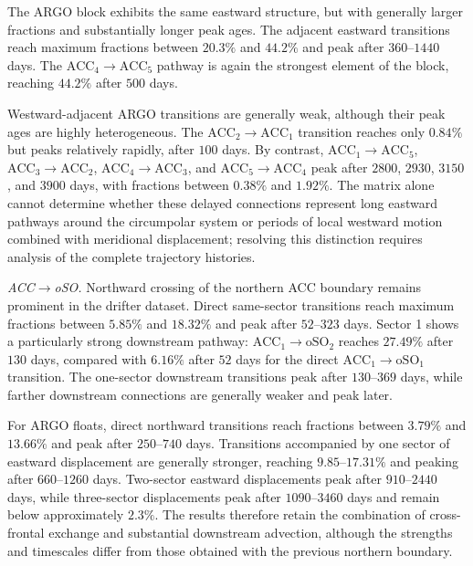 \documentclass[
  draft
]{agujournal2025}
\begin{document}
                The ARGO block exhibits the same eastward structure, but with generally larger fractions and substantially longer peak ages. The adjacent eastward transitions reach maximum fractions between $20.3 \%$ and $44.2 \%$ and peak after $360$--$1440$ days. The $\mathrm{ACC}_4 \rightarrow \mathrm{ACC}_5$ pathway is again the strongest element of the block, reaching $44.2 \%$ after $500$ days.
    
                Westward-adjacent ARGO transitions are generally weak, although their peak ages are highly heterogeneous. The $\mathrm{ACC}_2 \rightarrow \mathrm{ACC}_1$ transition reaches only $0.84 \%$ but peaks relatively rapidly, after $100$ days. By contrast, $\mathrm{ACC}_1 \rightarrow \mathrm{ACC}_5$, $\mathrm{ACC}_3 \rightarrow \mathrm{ACC}_2$, $\mathrm{ACC}_4 \rightarrow \mathrm{ACC}_3$, and $\mathrm{ACC}_5 \rightarrow \mathrm{ACC}_4$ peak after $2800$, $2930$, $3150$, and $3900$ days, with fractions between $0.38 \%$ and $1.92 \%$. The matrix alone cannot determine whether these delayed connections represent long eastward pathways around the circumpolar system or periods of local westward motion combined with meridional displacement; resolving this distinction requires analysis of the complete trajectory histories.
    
                \medskip
                \noindent
                \textit{ACC$\boldsymbol{\rightarrow}$oSO.}
                Northward crossing of the northern ACC boundary remains prominent in the drifter dataset. Direct same-sector transitions reach maximum fractions between $5.85 \%$ and $18.32 \%$ and peak after $52$--$323$ days. Sector 1 shows a particularly strong downstream pathway: $\mathrm{ACC}_1 \rightarrow \mathrm{oSO}_2$ reaches $27.49 \%$ after $130$ days, compared with $6.16 \%$ after $52$ days for the direct $\mathrm{ACC}_1 \rightarrow \mathrm{oSO}_1$ transition. The one-sector downstream transitions peak after $130$--$369$ days, while farther downstream connections are generally weaker and peak later.
    
                For ARGO floats, direct northward transitions reach fractions between $3.79 \%$ and $13.66 \%$ and peak after $250$--$740$ days. Transitions accompanied by one sector of eastward displacement are generally stronger, reaching $9.85$--$17.31 \%$ and peaking after $660$--$1260$ days. Two-sector eastward displacements peak after $910$--$2440$ days, while three-sector displacements peak after $1090$--$3460$ days and remain below approximately $2.3 \%$. The results therefore retain the combination of cross-frontal exchange and substantial downstream advection, although the strengths and timescales differ from those obtained with the previous northern boundary.
    
\end{document}
